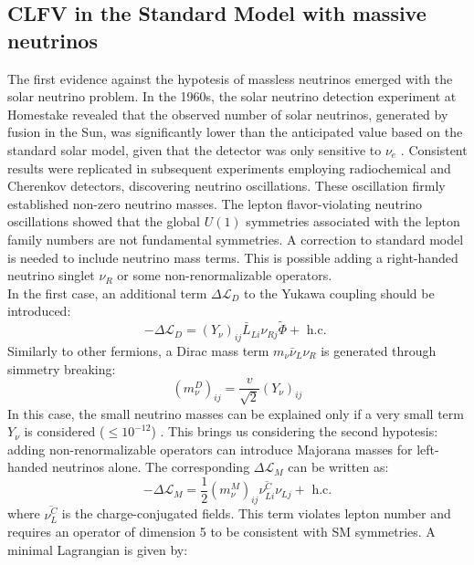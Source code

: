\subsection{CLFV in the Standard Model with massive neutrinos}\label{massiveneutrinos}
The first evidence against the hypotesis of massless neutrinos emerged with the solar neutrino problem. In the 1960s, the solar neutrino detection experiment at Homestake revealed that the observed number of solar neutrinos, generated by fusion in the Sun, was significantly lower than the anticipated value based on the standard solar model, given that the detector was only sensitive to $\nu_e$ \cite{PhysRevLett.20.1205}. Consistent results were replicated in subsequent experiments employing radiochemical and Cherenkov detectors, discovering neutrino oscillations. These oscillation firmly established non-zero neutrino masses. The lepton flavor-violating neutrino oscillations showed that the global $U(1)$ symmetries associated with the lepton family numbers are not fundamental symmetries. A correction to standard model is needed to include neutrino mass terms. This is possible adding a right-handed neutrino singlet $\nu_R$ or some non-renormalizable operators.
\\
In the first case, an additional term $\Delta \mathscr{L}_D$ to the Yukawa coupling should be introduced:
\begin{equation}
-\Delta \mathscr{L}_D=\left(Y_\nu\right)_{i j} \bar{L}_{L i} \nu_{Rj} \widetilde{\Phi}+\text { h.c. }
\end{equation}
Similarly to other fermions, a Dirac mass term $m_{\nu} \bar{\nu}_L \nu_R$ is generated through simmetry breaking:
\begin{equation}
\left(m_\nu^D\right)_{i j}=\frac{v}{\sqrt{2}}\left(Y_\nu\right)_{i j}
\end{equation}
In this case, the small neutrino masses can be explained only if a very small term $Y_\nu$ is considered ($\leq 10^{-12}$) \cite{clfv_signorelli}. This brings us considering the second hypotesis: adding non-renormalizable operators can introduce Majorana masses for left-handed neutrinos alone. The corresponding $\Delta \mathscr{L}_M$ can be written as:
\begin{equation}
-\Delta \mathscr{L}_M=\frac{1}{2}\left(m_\nu^M\right)_{i j} \overline{\nu_{L i}^C} \nu_{L j}+\text{ h.c.}
\end{equation}
where $\overline{\nu_{L }^C} $ is the charge-conjugated fields. This term violates lepton number and requires an operator of dimension 5 \cite{wein} to be consistent with SM symmetries. A minimal Lagrangian is given by:
